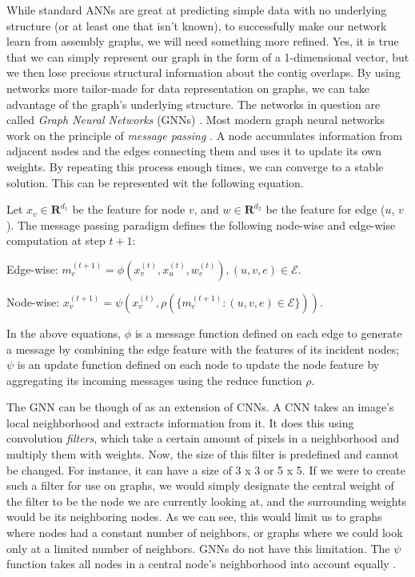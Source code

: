 \documentclass[times, utf8, diplomski, english]{fer_eng}
\begin{document}
While standard ANNs are great at predicting simple data with no underlying structure (or at least one that isn't known), to successfully make our network learn from assembly graphs, we will need something more refined. Yes, it is true that we can simply represent our graph in the form of a 1-dimensional vector, but we then lose precious structural information about the contig overlaps. By using networks more tailor-made for data representation on graphs, we can take advantage of the graph's underlying structure. The networks in question are called \textit{Graph Neural Networks} (GNNs) \cite{GNN}. Most modern graph neural networks work on the principle of \textit{message passing} \cite{message_passing}. A node accumulates information from adjacent nodes and the edges connecting them and uses it to update its own weights. By repeating this process enough times, we can converge to a stable solution. This can be represented wit the following equation.


Let $x_v \in \mathbf{R}^{d_1}$ be the feature for node $v$, and $w \in \mathbf{R}^{d_2}$ be the feature for edge ($u$, $v$). The message passing paradigm defines the following node-wise and edge-wise computation at step $t+1$:

Edge-wise: $m_e^{(t+1)} = \phi (x_v^{(t)}, x_u^{(t)}, w_e^{(t)}), (u, v, e) \in \mathcal{E}$.

Node-wise: $x_v^{(t+1)} = \psi (x_v^{(t)}, \rho (\{m_e^{(t+1)}: (u, v, e) \in \mathcal{E}\}))$.

In the above equations, $\phi$ is a message function defined on each edge to generate a message by combining the edge feature with the features of its incident nodes; $\psi$ is an update function defined on each node to update the node feature by aggregating its incoming messages using the reduce function $\rho$.

The GNN can be though of as an extension of CNNs. A CNN takes an image's local neighborhood and extracts information from it. It does this using convolution \textit{filters}, which take a certain amount of pixels in a neighborhood and multiply them with weights. Now, the size of this filter is predefined and cannot be changed. For instance, it can have a size of 3 x 3 or 5 x 5. If we were to create such a filter for use on graphs, we would simply designate the central weight of the filter to be the node we are currently looking at, and the surrounding weights would be its neighboring nodes. As we can see, this would limit us to graphs where nodes had a constant number of neighbors, or graphs where we could look only at a limited number of neighbors. GNNs do not have this limitation. The $\psi$ function takes all nodes in a central node's neighborhood into account equally \cite{GRL} \cite{bronstein2021geometric}.
\end{document}
